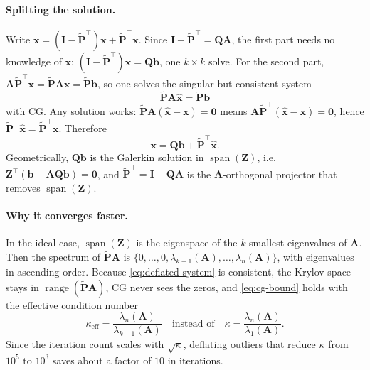\paragraph{Splitting the solution.}
Write $\mathbf{x} = (\mathbf{I} - \tilde{\mathbf{P}}^\top)\mathbf{x} + \tilde{\mathbf{P}}^\top\mathbf{x}$.
Since $\mathbf{I} - \tilde{\mathbf{P}}^\top = \mathbf{Q}\mathbf{A}$, the first part
needs no knowledge of $\mathbf{x}$:
$(\mathbf{I} - \tilde{\mathbf{P}}^\top)\mathbf{x} = \mathbf{Q}\mathbf{b}$, one
$k \times k$ solve. For the second part,
$\mathbf{A}\tilde{\mathbf{P}}^\top\mathbf{x} = \tilde{\mathbf{P}}\mathbf{A}\mathbf{x} = \tilde{\mathbf{P}}\mathbf{b}$,
so one solves the singular but consistent system
\begin{equation}
  \tilde{\mathbf{P}} \mathbf{A} \hat{\mathbf{x}} = \tilde{\mathbf{P}} \mathbf{b}
  \label{eq:deflated-system}
\end{equation}
with CG. Any solution works: $\tilde{\mathbf{P}}\mathbf{A}(\hat{\mathbf{x}} - \mathbf{x}) = \mathbf{0}$
means $\mathbf{A}\tilde{\mathbf{P}}^\top(\hat{\mathbf{x}} - \mathbf{x}) = \mathbf{0}$, hence
$\tilde{\mathbf{P}}^\top\hat{\mathbf{x}} = \tilde{\mathbf{P}}^\top\mathbf{x}$. Therefore
\begin{equation}
  \mathbf{x} = \mathbf{Q}\mathbf{b} + \tilde{\mathbf{P}}^\top \hat{\mathbf{x}} .
  \label{eq:deflated-solution}
\end{equation}
Geometrically, $\mathbf{Q}\mathbf{b}$ is the Galerkin solution in
$\operatorname{span}(\mathbf{Z})$, i.e.\
$\mathbf{Z}^\top(\mathbf{b} - \mathbf{A}\mathbf{Q}\mathbf{b}) = \mathbf{0}$, and
$\tilde{\mathbf{P}}^\top = \mathbf{I} - \mathbf{Q}\mathbf{A}$ is the
$\mathbf{A}$-orthogonal projector that removes $\operatorname{span}(\mathbf{Z})$.

\paragraph{Why it converges faster.}
In the ideal case, $\operatorname{span}(\mathbf{Z})$ is the eigenspace of the
$k$ smallest eigenvalues of $\mathbf{A}$. Then the spectrum of $\tilde{\mathbf{P}}\mathbf{A}$ is
$\{0, \dots, 0, \lambda_{k+1}(\mathbf{A}), \dots, \lambda_n(\mathbf{A})\}$, with
eigenvalues in ascending order. Because \eqref{eq:deflated-system} is
consistent, the Krylov space stays in $\operatorname{range}(\tilde{\mathbf{P}}\mathbf{A})$,
CG never sees the zeros, and \eqref{eq:cg-bound} holds with the effective
condition number
\begin{equation}
  \kappa_{\mathrm{eff}} = \frac{\lambda_n(\mathbf{A})}{\lambda_{k+1}(\mathbf{A})}
  \quad \text{instead of} \quad
  \kappa = \frac{\lambda_n(\mathbf{A})}{\lambda_1(\mathbf{A})} .
\end{equation}
Since the iteration count scales with $\sqrt{\kappa}$, deflating outliers that
reduce $\kappa$ from $10^5$ to $10^3$ saves about a factor of $10$ in iterations.


